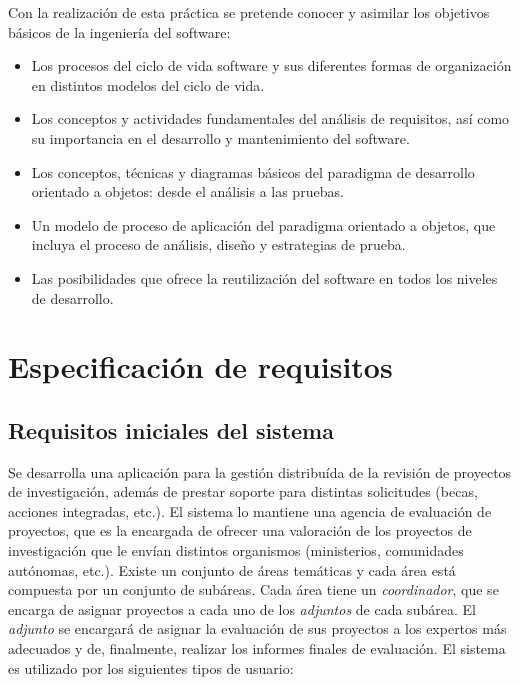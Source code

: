 \documentclass[11pt,a4paper,spanish,twoside]{book}
\begin{document}
Con la realización de esta práctica se pretende conocer y asimilar los
objetivos básicos de la ingeniería del software: 
\begin{itemize}
\item Los procesos del ciclo de vida software y sus diferentes formas de
  organización en distintos modelos del ciclo de vida.
\item Los conceptos y actividades fundamentales del análisis de requisitos,
  así como su importancia en el desarrollo y mantenimiento del software.
\item Los conceptos, técnicas y diagramas básicos del paradigma de desarrollo
  orientado a objetos: desde el análisis a las pruebas.
\item Un modelo de proceso de aplicación del paradigma orientado a objetos, que
  incluya el proceso de análisis, diseño y estrategias de prueba.
\item Las posibilidades que ofrece la reutilización del software en todos los
  niveles de desarrollo.
\end{itemize}
\chapter{Especificación de requisitos}
\section{Requisitos iniciales del sistema}
Se desarrolla una aplicación para la gestión distribuída de la
revisión de proyectos de investigación, además de prestar soporte para
distintas solicitudes (becas, acciones integradas, etc.). El sistema lo
mantiene una agencia de evaluación de proyectos, que es la encargada
de ofrecer una valoración de los proyectos de investigación que le envían
distintos organismos (ministerios, comunidades autónomas, etc.). Existe un
conjunto de áreas temáticas y cada área está compuesta por un conjunto de
subáreas. Cada área tiene un \emph{coordinador}, que se encarga de asignar
proyectos a cada uno de los \emph{adjuntos} de cada subárea. El
\emph{adjunto} se encargará de asignar la evaluación de sus proyectos a los
expertos más adecuados y de, finalmente, realizar los informes finales de
evaluación. El sistema es utilizado por los siguientes tipos de usuario: 
\end{document}
